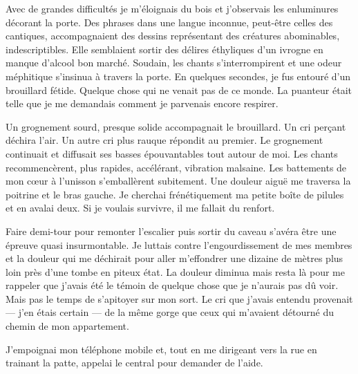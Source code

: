 Avec de grandes difficultés je m'éloignais du bois et j'observais les enluminures décorant la porte. Des phrases dans 
une langue inconnue, peut-être celles des cantiques, accompagnaient des dessins représentant des créatures abominables, 
indescriptibles. Elle semblaient sortir des délires éthyliques d'un ivrogne en manque d'alcool bon marché. Soudain, les 
chants s'interrompirent et une odeur méphitique s'insinua à travers la porte. En quelques secondes, je fus entouré 
d'un brouillard fétide. Quelque chose qui ne venait pas de ce monde. La puanteur était telle que je me demandais 
comment je parvenais encore respirer.

Un grognement sourd, presque solide accompagnait le brouillard. Un cri perçant déchira l'air. Un autre cri plus rauque 
répondit au premier. Le grognement continuait et diffusait ses basses épouvantables tout autour de moi. Les chants 
recommencèrent, plus rapides, accélérant, vibration malsaine. Les battements de mon cœur à l'unisson s'emballèrent 
subitement. Une douleur aiguë me traversa la poitrine et le bras gauche. Je cherchai frénétiquement ma petite boîte de 
pilules et en avalai deux. Si je voulais survivre, il me fallait du renfort.

Faire demi-tour pour remonter l'escalier puis sortir du caveau s'avéra être une épreuve quasi insurmontable. Je luttais 
contre l'engourdissement de mes membres et la douleur qui me déchirait pour aller m'effondrer une dizaine de mètres 
plus loin près d'une tombe en piteux état. La douleur diminua mais resta là pour me rappeler que j'avais été le témoin 
de quelque chose que je n'aurais pas dû voir. Mais pas le temps de s'apitoyer sur mon sort. Le cri que j'avais entendu 
provenait — j'en étais certain — de la même gorge que ceux qui m'avaient détourné du chemin de mon appartement.

J'empoignai mon téléphone mobile et, tout en me dirigeant vers la rue en trainant la patte, appelai le central pour 
demander de l'aide.